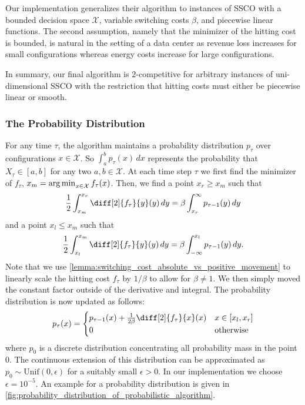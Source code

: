 Our implementation generalizes their algorithm to instances of SSCO with a bounded decision space $\mathcal{X}$, variable switching costs $\beta$, and piecewise linear functions. The second assumption, namely that the minimizer of the hitting cost is bounded, is natural in the setting of a data center as revenue loss increases for small configurations whereas energy costs increase for large configurations.

In summary, our final algorithm is $2$-competitive for arbitrary instances of uni-dimensional SSCO with the restriction that hitting costs must either be piecewise linear or smooth.

\subsubsection{The Probability Distribution}

For any time $\tau$, the algorithm maintains a probability distribution $p_{\tau}$ over configurations $x \in \mathcal{X}$. So $\int_a^b p_{\tau}(x) \,dx$ represents the probability that $X_{\tau} \in [a,b]$ for any two $a, b \in \mathcal{X}$. At each time step $\tau$ we first find the minimizer of $f_{\tau}$, $x_m = \operatorname*{arg\,min}_{x \in \mathcal{X}} f_{\tau}(x)$. Then, we find a point $x_r \geq x_m$ such that \begin{align}\label{eq:ud:probabilistic:right}
    \frac{1}{2} \int_{x_m}^{x_r} \diff[2]{f_{\tau}}{y}(y) \,dy = \beta \int_{x_r}^{\infty} p_{\tau-1}(y) \,dy
\end{align} and a point $x_l \leq x_m$ such that \begin{align}\label{eq:ud:probabilistic:left}
    \frac{1}{2} \int_{x_l}^{x_m} \diff[2]{f_{\tau}}{y}(y) \,dy = \beta \int_{-\infty}^{x_l} p_{\tau-1}(y) \,dy.
\end{align} Note that we use \autoref{lemma:switching_cost_absolute_vs_positive_movement} to linearly scale the hitting cost $f_{\tau}$ by $1 / \beta$ to allow for $\beta \neq 1$. We then simply moved the constant factor outside of the derivative and integral. The probability distribution is now updated as follows: \begin{align}\label{eq:ud:probabilistic:update}
    p_{\tau}(x) = \begin{cases}
        p_{\tau-1}(x) + \frac{1}{2 \beta} \diff[2]{f_{\tau}}{x}(x) & x \in [x_l,x_r] \\
        0 & \text{otherwise}
    \end{cases}
\end{align} where $p_0$ is a discrete distribution concentrating all probability mass in the point $0$. The continuous extension of this distribution can be approximated as $p_0 \sim \text{Unif}(0, \epsilon)$ for a suitably small $\epsilon > 0$. In our implementation we choose $\epsilon = 10^{-5}$. An example for a probability distribution is given in \autoref{fig:probability_distribution_of_probabilistic_algorithm}.

